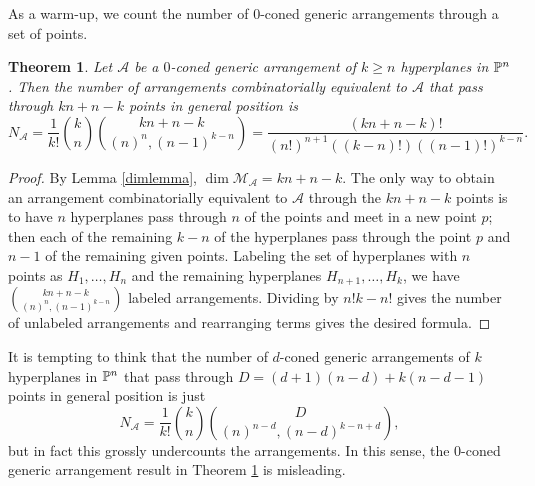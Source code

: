 \documentclass[12pt]{article}
\theoremstyle{plain}
\newtheorem{theorem}{Theorem}
\theoremstyle{definition}
\newcommand{\A}{\mathcal{A}}
\newcommand{\M}{\mathcal{M}}
\newcommand{\N}{N}
\newcommand{\MLA}{\M_{\A}}
\renewcommand{\P}{\ensuremath \mathbb{P}}
\begin{document}
As a warm-up, we count the number of $0$-coned generic arrangements through a set of
points. 

\begin{theorem} \label{0pencil}
Let $\A$ be a $0$-coned generic arrangement of $k \geq n$ hyperplanes in $\P^n$. Then the number of arrangements combinatorially
equivalent to $\A$ that pass through $kn+n-k$ points in general
position is $$\N_\A = \frac{1}{k!} \binom{k}{n}
\binom{kn+n-k}{(n)^n,(n-1)^{k-n}}  = \frac{(kn+n-k)!}{(n!)^{n+1}((k-n)!)((n-1)!)^{k-n}}.  $$
\end{theorem}

\begin{proof}
By Lemma \ref{dimlemma}, $\dim \MLA = kn+n-k$. The only way to obtain
an arrangement combinatorially equivalent to $\A$ through the $kn+n-k$
points is to have $n$ hyperplanes pass through $n$ of the points and
meet in a new point $p$; then each of the remaining $k-n$ of the hyperplanes
pass through the point $p$ and $n-1$ of the remaining given points. Labeling the
set of hyperplanes with $n$ points as $H_1, \ldots, H_n$ and the
remaining hyperplanes $H_{n+1},\ldots, H_k$, we have
$\binom{kn+n-k}{(n)^n,(n-1)^{k-n}}$ labeled arrangements. Dividing by
$n! k-n!$ gives the number of unlabeled arrangements and rearranging
terms gives the desired formula. 
\end{proof}

It is tempting to think that the number of $d$-coned generic
arrangements of $k$ hyperplanes in $\P^n$
that pass through $D =
(d+1)(n-d) + k(n-d-1)$ points in general position is just $$\N_\A = \frac{1}{k!} \binom{k}{n}
\binom{D}{(n)^{n-d},(n-d)^{k-n+d}},  $$
but in fact this grossly undercounts the arrangements. In this sense,
the $0$-coned generic arrangement result in Theorem \ref{0pencil} is misleading. 
\end{document}
